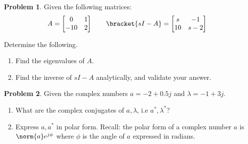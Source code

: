 \documentclass[10pt]{article}
\theoremstyle{definition}
\newtheorem{prob}{Problem}[section]
\newenvironment{subprob}%
{\renewcommand{\theenumi}{\alph{enumi}}\renewcommand{\labelenumi}{(\theenumi)}\begin{enumerate}}%
{\end{enumerate}}%
\begin{document}
\clearpage\newpage

\begin{prob}
    Given the following matrices:
        \begin{align*}
            A = \begin{bmatrix} 0 & 1 \\ -10 & 2\end{bmatrix} \qquad 
            \bracket{sI-A} = \begin{bmatrix} s & -1 \\ 10 & s- 2 \end{bmatrix}
        \end{align*}

    Determine the following.
    \begin{subprob}
    \item Find the eigenvalues of \( A\).
    \item Find the inverse of \( sI -A \) analytically, and validate your answer.
    \end{subprob}
\end{prob}

\clearpage\newpage

\begin{prob}
    Given the complex numbers \( a = -2 + 0.5 j \) and \( \lambda = -1 + 3 j\).

    \begin{subprob}
    \item What are the complex conjugates of \( a, \lambda\), i.e \( a^*, \lambda^*\)?
    \item Express \( a, a^*\) in polar form.
        Recall: the polar form of a complex number \( a \) is \( \norm{a} e^{j \phi} \) where \( \phi\) is the angle of \( a \) expressed in radians.
    \end{subprob}
\end{prob}
\end{document}

